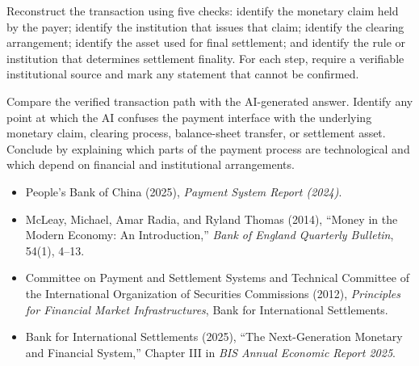 Reconstruct the transaction using five checks: identify the monetary claim held by the payer; identify the institution that issues that claim; identify the clearing arrangement; identify the asset used for final settlement; and identify the rule or institution that determines settlement finality. For each step, require a verifiable institutional source and mark any statement that cannot be confirmed.

Compare the verified transaction path with the AI-generated answer. Identify any point at which the AI confuses the payment interface with the underlying monetary claim, clearing process, balance-sheet transfer, or settlement asset. Conclude by explaining which parts of the payment process are technological and which depend on financial and institutional arrangements.


\begin{itemize}

\item People's Bank of China (2025), \emph{Payment System Report (2024)}.

\item McLeay, Michael, Amar Radia, and Ryland Thomas (2014),
``Money in the Modern Economy: An Introduction,''
\emph{Bank of England Quarterly Bulletin}, 54(1), 4--13.

\item Committee on Payment and Settlement Systems and
Technical Committee of the International Organization of Securities
Commissions (2012), \emph{Principles for Financial Market Infrastructures},
Bank for International Settlements.

\item Bank for International Settlements (2025),
``The Next-Generation Monetary and Financial System,''
Chapter III in \emph{BIS Annual Economic Report 2025}.

\end{itemize}


